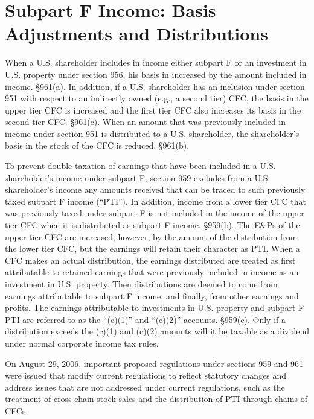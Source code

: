 \section{Subpart F Income:  Basis Adjustments and Distributions}


When a U.S. shareholder includes in income either subpart F or an investment in U.S. property under section 956, his basis in increased by the amount included in income.  \S 961(a).  In addition, if a U.S. shareholder has an inclusion under section 951 with respect to an indirectly owned (e.g., a second tier) CFC, the basis in the upper tier CFC is increased and the first tier CFC also increases its basis in the second tier CFC.  \S 961(c).  When an amount that was previously included in income under section 951 is distributed to a U.S. shareholder, the shareholder's basis in the stock of the CFC is reduced.  \S 961(b).

To prevent double taxation of earnings that have been included in a U.S. shareholder's income under subpart F, section 959 excludes from a U.S. shareholder's income any amounts received that can be traced to such previously taxed subpart F income (``PTI'').  In addition, income from a lower tier CFC that was previously taxed under subpart F is not included in the income of the upper tier CFC when it is distributed as subpart F income.  \S 959(b).  The E\&Ps of the upper tier CFC are increased, however, by the amount of the distribution from the lower tier CFC, but the earnings will retain their character as PTI.  When a CFC makes an actual distribution, the earnings distributed are treated as first attributable to retained earnings that were previously included in income as an investment in U.S. property. Then distributions are deemed to come from earnings attributable to subpart F income, and finally, from other earnings and profits.  The earnings attributable to investments in U.S. property and subpart F PTI are referred to as the ``(c)(1)'' and ``(c)(2)'' accounts.  \S 959(c).  Only if a distribution exceeds the (c)(1) and (c)(2) amounts will it be taxable as a dividend under normal corporate income tax rules.  

On August 29, 2006, important proposed regulations under sections 959 and 961 were issued that modify current regulations to reflect statutory changes and address issues that are not addressed under current regulations, such as the treatment of cross-chain stock sales and the distribution of PTI through chains of CFCs. 

